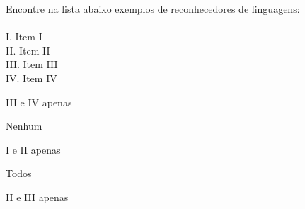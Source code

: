 \question[10]
Encontre na lista abaixo exemplos de reconhecedores de linguagens:\\
\\
I. Item I\\
II. Item II\\
III. Item III\\
IV. Item IV
\\
\begin{choices}
\item III e IV apenas
\item Nenhum %
\item I e II apenas
\item Todos
\item II e III apenas
\end{choices}
\answerline

